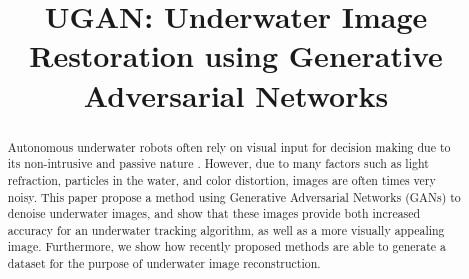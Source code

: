 \documentclass[conference]{IEEEtran}
\begin{document}
\title{UGAN: Underwater Image Restoration using Generative Adversarial Networks}

\author{
\and
{}
\and
{}
}

% 

\maketitle

\begin{abstract}
Autonomous underwater robots often rely on visual input for decision making due to its non-intrusive and passive nature
. However, due to many factors such as light refraction, particles in the water, and color distortion, images are often times very noisy. This paper propose a method using Generative Adversarial Networks (GANs) to denoise underwater images, and show that these images provide both increased accuracy
for an underwater tracking algorithm, as well as a more visually appealing image. Furthermore, we show how recently
proposed methods are able to generate a dataset for the purpose of underwater image reconstruction.
\end{abstract}
\end{document}
